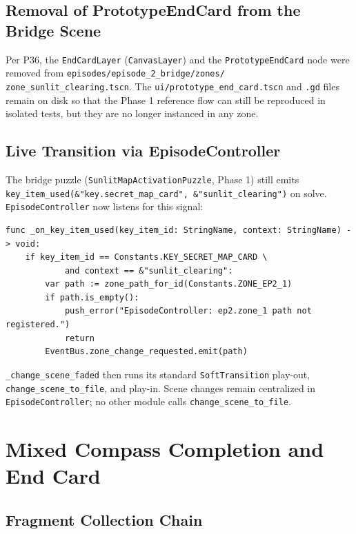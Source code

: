 \documentclass[12pt, a4paper]{article}
\begin{document}
\subsection{Removal of PrototypeEndCard from the Bridge Scene}

Per P36, the \texttt{EndCardLayer} (\texttt{CanvasLayer}) and the
\texttt{PrototypeEndCard} node were removed from
\texttt{episodes/episode\_2\_bridge/zones/} \texttt{zone\_sunlit\_clearing.tscn}.
The \texttt{ui/prototype\_end\_card.tscn} and \texttt{.gd} files remain on
disk so that the Phase 1 reference flow can still be reproduced in isolated
tests, but they are no longer instanced in any zone.

\subsection{Live Transition via EpisodeController}

The bridge puzzle (\texttt{SunlitMapActivationPuzzle}, Phase 1) still emits
\texttt{key\_item\_used(\&"key.secret\_map\_card", \&"sunlit\_clearing")} on
solve. \texttt{EpisodeController} now listens for this signal:

\begin{lstlisting}
func _on_key_item_used(key_item_id: StringName, context: StringName) -> void:
    if key_item_id == Constants.KEY_SECRET_MAP_CARD \
            and context == &"sunlit_clearing":
        var path := zone_path_for_id(Constants.ZONE_EP2_1)
        if path.is_empty():
            push_error("EpisodeController: ep2.zone_1 path not registered.")
            return
        EventBus.zone_change_requested.emit(path)
\end{lstlisting}

\texttt{\_change\_scene\_faded} then runs its standard
\texttt{SoftTransition} play-out, \texttt{change\_scene\_to\_file}, and
play-in. Scene changes remain centralized in \texttt{EpisodeController}; no
other module calls \texttt{change\_scene\_to\_file}.

\section{Mixed Compass Completion and End Card}

\subsection{Fragment Collection Chain}
\end{document}
